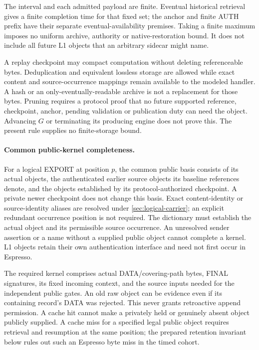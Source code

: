 The interval and each admitted payload are finite. Eventual historical
retrieval gives a finite completion time for that fixed set; the anchor
and finite AUTH prefix have their separate eventual-availability
premises. Taking a finite maximum imposes no uniform archive,
authority or native-restoration bound. It does not include all future
L1 objects that an arbitrary sidecar might name.

A replay checkpoint may compact computation without deleting
referenceable bytes. Deduplication and equivalent lossless storage are
allowed while exact content and source-occurrence mappings remain
available to the modeled handler. A hash or an only-eventually-readable
archive is not a replacement for those bytes. Pruning requires a
protocol proof that no future supported reference, checkpoint,
anchor, pending validation or publication duty can need the object.
Advancing $G$ or terminating its producing engine does not prove this.
The present rule supplies no finite-storage bound.

\paragraph{Common public-kernel completeness.}
\label{sec:record-completeness}
For a logical EXPORT at position $p$, the common public basis consists
of its actual objects, the authenticated earlier source objects its
baseline references denote, and the objects established by its
protocol-authorized checkpoint. A private newer checkpoint does not
change this basis. Exact content-identity or source-identity aliases
are resolved under \cref{sec:logical-carrier}; an explicit redundant
occurrence position is not required. The dictionary must establish the
actual object and its permissible source occurrence. An unresolved
sender assertion or a name without a supplied public object cannot
complete a kernel. L1 objects retain their own authentication interface
and need not first occur in Espresso.

The required kernel comprises actual DATA/covering-path bytes, FINAL
signatures, its fixed incoming context, and the source inputs needed
for the independent public gates. An old raw object can be evidence
even if its containing record's DATA was rejected. This never grants
retroactive append permission. A cache hit cannot make a privately
held or genuinely absent object publicly supplied. A cache miss for a
specified legal public object requires retrieval and resumption at the
same position; the prepared retention invariant below rules out such
an Espresso byte miss in the timed cohort.

